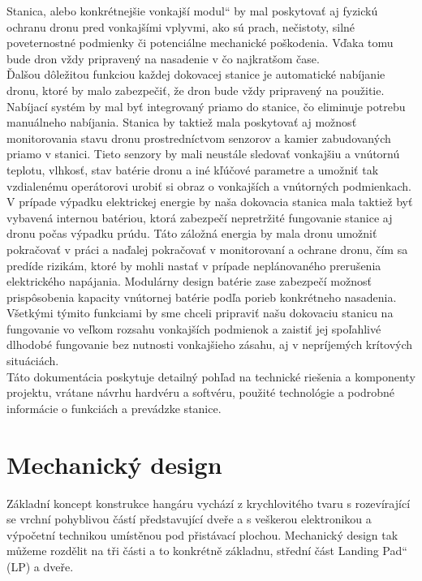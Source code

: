 \documentclass[a4paper]{article}
\newcommand\uvoz[1]{\quotedblbase #1\textquotedblleft}%
\begin{document}
\noindent
Stanica, alebo konkrétnejšie \uvoz{vonkajší modul} by mal poskytovať aj fyzickú ochranu dronu pred vonkajšími vplyvmi, ako sú prach, nečistoty, silné poveternostné podmienky či potenciálne mechanické poškodenia. Vďaka tomu bude dron vždy pripravený na nasadenie v čo najkratšom čase.\\

\noindent
Ďalšou dôležitou funkciou každej dokovacej stanice je automatické nabíjanie dronu, ktoré by malo zabezpečiť, že dron bude vždy pripravený na použitie. Nabíjací systém by mal byť integrovaný priamo do stanice, čo eliminuje potrebu manuálneho nabíjania. Stanica by taktiež mala poskytovať aj možnosť monitorovania stavu dronu prostredníctvom senzorov a kamier zabudovaných priamo v stanici. Tieto senzory by mali neustále sledovať vonkajšiu a vnútornú teplotu, vlhkosť, stav batérie dronu a iné kľúčové parametre a umožniť tak vzdialenému operátorovi urobiť si obraz o vonkajších a vnútorných podmienkach.\\

\noindent
V prípade výpadku elektrickej energie by naša dokovacia stanica mala taktiež byť vybavená internou batériou, ktorá zabezpečí nepretržité fungovanie stanice aj dronu počas výpadku prúdu. Táto záložná energia by mala  dronu umožniť pokračovať v práci a naďalej pokračovať v monitorovaní a ochrane dronu, čím sa predíde rizikám, ktoré by mohli nastať v prípade neplánovaného prerušenia elektrického napájania. Modulárny design batérie zase zabezpečí možnosť prispôsobenia kapacity vnútornej batérie podľa porieb konkrétneho nasadenia.\\

\noindent
Všetkými týmito funkciami by sme chceli pripraviť našu dokovaciu stanicu na fungovanie vo veľkom rozsahu vonkajších podmienok a zaistiť jej spoľahlivé dlhodobé fungovanie bez nutnosti vonkajšieho zásahu, aj v nepríjemých krítových situáciách.\\

\noindent
Táto dokumentácia poskytuje detailný pohľad na technické riešenia a komponenty projektu, vrátane návrhu hardvéru a softvéru, použité technológie a podrobné informácie o funkciách a prevádzke stanice.
 

\section{Mechanický design} \label{sec:konstrukce}
    Základní koncept konstrukce hangáru vychází z krychlovitého tvaru s rozevírající se vrchní pohyblivou částí představující dveře a s veškerou elektronikou a výpočetní technikou umístěnou pod přistávací plochou. Mechanický design tak můžeme rozdělit na tři části a to konkrétně základnu, střední část \uvoz{Landing Pad} (\acs{LP}) a dveře.\\
    
\end{document}
